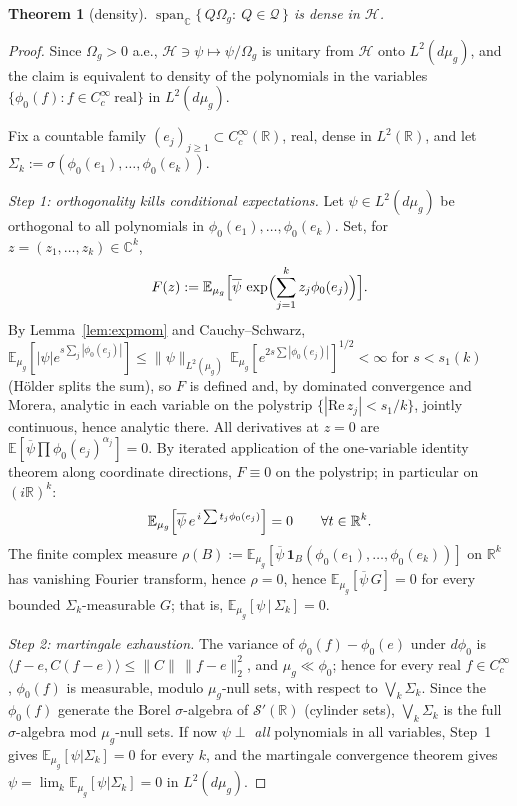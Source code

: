 \documentclass[11pt,a4paper]{article}
\theoremstyle{plain}
\newtheorem{theorem}{Theorem}[section]
\theoremstyle{definition}
\newcommand{\R}{\mathbb{R}}
\newcommand{\E}{\mathbb{E}}
\newcommand{\Om}{\Omega}
\newcommand{\Q}{\mathcal{Q}}
\newcommand{\HH}{\mathcal{H}}
\newcommand{\ip}[2]{\langle #1,#2\rangle}
\DeclareMathOperator{\Span}{span}
\begin{document}
\begin{theorem}[density]\label{thm:dense}
$\Span_{\mathbb C}\{\,Q\Om_g:\ Q\in\Q\,\}$ is dense in $\HH$.
\end{theorem}

\begin{proof}
Since $\Om_g>0$ a.e., $\HH\ni\psi\mapsto\psi/\Om_g$ is unitary from $\HH$ onto $L^2(d\mu_g)$, and
the claim is equivalent to density of the polynomials in the variables
$\{\phi_0(f):f\in C_c^\infty\ \text{real}\}$ in $L^2(d\mu_g)$.

Fix a countable family $(e_j)_{j\ge1}\subset C_c^\infty(\R)$, real, dense in $L^2(\R)$, and let
$\Sigma_k:=\sigma(\phi_0(e_1),\dots,\phi_0(e_k))$.

\emph{Step 1: orthogonality kills conditional expectations.} Let $\psi\in L^2(d\mu_g)$ be
orthogonal to all polynomials in $\phi_0(e_1),\dots,\phi_0(e_k)$. Set, for
$z=(z_1,\dots,z_k)\in\mathbb C^k$,
\[
  F(z):=\E_{\mu_g}\Bigl[\overline\psi\,\exp\Bigl(\sum_{j=1}^kz_j\phi_0(e_j)\Bigr)\Bigr].
\]
By Lemma~\ref{lem:expmom} and Cauchy--Schwarz,
$\E_{\mu_g}[|\psi|e^{s\sum_j|\phi_0(e_j)|}]\le\|\psi\|_{L^2(\mu_g)}\,
\E_{\mu_g}[e^{2s\sum|\phi_0(e_j)|}]^{1/2}<\infty$ for $s<s_1(k)$ (H\"older splits the sum), so $F$
is defined and, by dominated convergence and Morera, analytic in each variable on the polystrip
$\{|\mathrm{Re}\,z_j|<s_1/k\}$, jointly continuous, hence analytic there. All derivatives at
$z=0$ are $\E[\overline\psi\prod\phi_0(e_j)^{\alpha_j}]=0$. By iterated application of the
one-variable identity theorem along coordinate directions, $F\equiv0$ on the polystrip; in
particular on $(i\R)^k$:
\[
  \E_{\mu_g}\Bigl[\overline\psi\,e^{\,i\sum t_j\phi_0(e_j)}\Bigr]=0\qquad\forall t\in\R^k .
\]
The finite complex measure $\rho(B):=\E_{\mu_g}[\overline\psi\,\mathbf 1_B(\phi_0(e_1),\dots,
\phi_0(e_k))]$ on $\R^k$ has vanishing Fourier transform, hence $\rho=0$, hence
$\E_{\mu_g}[\overline\psi\,G]=0$ for every bounded $\Sigma_k$-measurable $G$; that is,
$\E_{\mu_g}[\psi\,|\,\Sigma_k]=0$.

\emph{Step 2: martingale exhaustion.} The variance of $\phi_0(f)-\phi_0(e)$ under $d\phi_0$ is
$\ip{f-e}{C(f-e)}\le\|C\|\,\|f-e\|_2^2$, and $\mu_g\ll\phi_0$; hence for every real
$f\in C_c^\infty$, $\phi_0(f)$ is measurable, modulo $\mu_g$-null sets, with respect to
$\bigvee_k\Sigma_k$. Since the $\phi_0(f)$ generate the Borel $\sigma$-algebra of
$\mathcal S'(\R)$ (cylinder sets), $\bigvee_k\Sigma_k$ is the full $\sigma$-algebra mod
$\mu_g$-null sets. If now $\psi\perp$ \emph{all} polynomials in all variables, Step~1 gives
$\E_{\mu_g}[\psi|\Sigma_k]=0$ for every $k$, and the martingale convergence theorem gives
$\psi=\lim_k\E_{\mu_g}[\psi|\Sigma_k]=0$ in $L^2(d\mu_g)$.
\end{proof}
\end{document}
